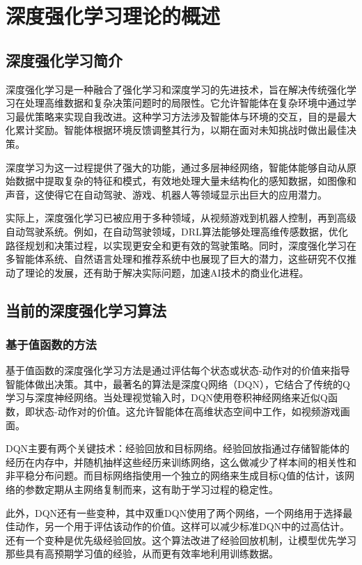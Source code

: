 \section{深度强化学习理论的概述}

\subsection{深度强化学习简介}

深度强化学习是一种融合了强化学习和深度学习的先进技术，旨在解决传统强化学习在处理高维数据和复杂决策问题时的局限性。它允许智能体在复杂环境中通过学习最优策略来实现自我改进。这种学习方法涉及智能体与环境的交互，目的是最大化累计奖励。智能体根据环境反馈调整其行为，以期在面对未知挑战时做出最佳决策。

深度学习为这一过程提供了强大的功能，通过多层神经网络，智能体能够自动从原始数据中提取复杂的特征和模式，有效地处理大量未结构化的感知数据，如图像和声音，这使得它在自动驾驶、游戏、机器人等领域显示出巨大的应用潜力。

实际上，深度强化学习已被应用于多种领域，从视频游戏到机器人控制，再到高级自动驾驶系统。例如，在自动驾驶领域，DRL算法能够处理高维传感数据，优化路径规划和决策过程，以实现更安全和更有效的驾驶策略。同时，深度强化学习在多智能体系统、自然语言处理和推荐系统中也展现了巨大的潜力，这些研究不仅推动了理论的发展，还有助于解决实际问题，加速AI技术的商业化进程。

\subsection{当前的深度强化学习算法}

\subsubsection{基于值函数的方法}

基于值函数的深度强化学习方法是通过评估每个状态或状态-动作对的价值来指导智能体做出决策。其中，最著名的算法是深度Q网络（DQN），它结合了传统的Q学习与深度神经网络。当处理视觉输入时，DQN使用卷积神经网络来近似Q函数，即状态-动作对的价值。这允许智能体在高维状态空间中工作，如视频游戏画面。

DQN主要有两个关键技术：经验回放和目标网络。经验回放指通过存储智能体的经历在内存中，并随机抽样这些经历来训练网络，这么做减少了样本间的相关性和非平稳分布问题。而目标网络指使用一个独立的网络来生成目标Q值的估计，该网络的参数定期从主网络复制而来，这有助于学习过程的稳定性。

此外，DQN还有一些变种，其中双重DQN使用了两个网络，一个网络用于选择最佳动作，另一个用于评估该动作的价值。这样可以减少标准DQN中的过高估计。还有一个变种是优先级经验回放。这个算法改进了经验回放机制，让模型优先学习那些具有高预期学习值的经验，从而更有效率地利用训练数据。

